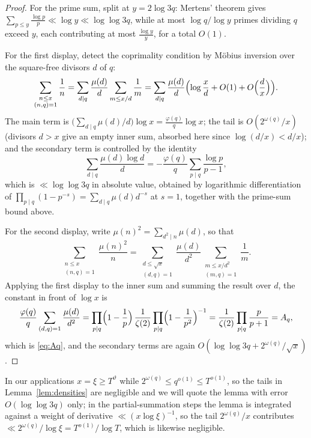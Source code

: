 \documentclass[10pt,a4paper]{amsart}
\numberwithin{equation}{section}
\begin{document}
\begin{proof}
For the prime sum, split at $y=2\log 3q$: Mertens' theorem gives $\sum_{p\le y}\frac{\log p}{p}\ll\log y\ll\log\log 3q$, while at most $\log q/\log y$ primes dividing $q$ exceed $y$, each contributing at most $\frac{\log y}{y}$, for a total $O(1)$.

For the first display, detect the coprimality condition by M\"obius inversion over the square-free divisors $d$ of $q$:
\[
\sum_{\substack{n\le x\\(n,q)=1}}\frac1n=\sum_{d\mid q}\frac{\mu(d)}{d}\sum_{m\le x/d}\frac1m
=\sum_{d\mid q}\frac{\mu(d)}{d}\Bigl(\log\frac xd+O(1)+O\Bigl(\frac dx\Bigr)\Bigr).
\]
The main term is $\bigl(\sum_{d\mid q}\mu(d)/d\bigr)\log x=\frac{\varphi(q)}{q}\log x$; the tail is $O(2^{\omega(q)}/x)$ (divisors $d>x$ give an empty inner sum, absorbed here since $\log(d/x)<d/x$); and the secondary term is controlled by the identity
\[
\sum_{d\mid q}\frac{\mu(d)\log d}{d}=-\frac{\varphi(q)}{q}\sum_{p\mid q}\frac{\log p}{p-1},
\]
which is $\ll\log\log 3q$ in absolute value, obtained by logarithmic differentiation of $\prod_{p\mid q}(1-p^{-s})=\sum_{d\mid q}\mu(d)d^{-s}$ at $s=1$, together with the prime-sum bound above.

For the second display, write $\mu(n)^2=\sum_{d^2\mid n}\mu(d)$, so that
\[
\sum_{\substack{n\le x\\(n,q)=1}}\frac{\mu(n)^2}{n}=\sum_{\substack{d\le\sqrt x\\(d,q)=1}}\frac{\mu(d)}{d^2}\sum_{\substack{m\le x/d^2\\(m,q)=1}}\frac1m .
\]
Applying the first display to the inner sum and summing the result over $d$, the constant in front of $\log x$ is
\[
\frac{\varphi(q)}{q}\sum_{(d,q)=1}\frac{\mu(d)}{d^2}
=\prod_{p\mid q}\Bigl(1-\frac1p\Bigr)\,\frac{1}{\zeta(2)}\prod_{p\mid q}\Bigl(1-\frac1{p^2}\Bigr)^{-1}
=\frac{1}{\zeta(2)}\prod_{p\mid q}\frac{p}{p+1}=A_q,
\]
which is \eqref{eq:Aq}, and the secondary terms are again $O(\log\log 3q+2^{\omega(q)}/\sqrt x)$.
\end{proof}

In our applications $x=\xi\ge T^{\vartheta}$ while $2^{\omega(q)}\le q^{o(1)}\le T^{o(1)}$, so the tails in Lemma~\ref{lem:densities} are negligible and we will quote the lemma with error $O(\log\log 3q)$ only; in the partial-summation steps the lemma is integrated against a weight of derivative $\ll(x\log\xi)^{-1}$, so the tail $2^{\omega(q)}/x$ contributes $\ll 2^{\omega(q)}/\log\xi=T^{o(1)}/\log T$, which is likewise negligible.
\end{document}
